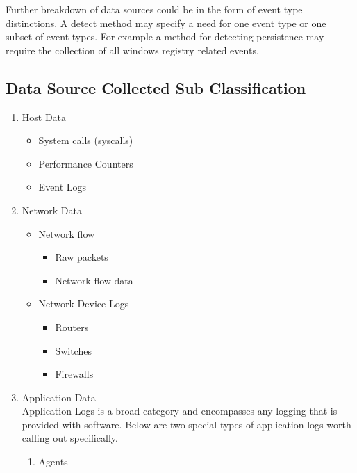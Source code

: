 Further breakdown of data sources could be in the form of event type distinctions. 
A detect method may specify a need for one event type or one subset of event types. 
For example a method for detecting persistence may require the collection of all windows registry related events.

\subsection{Data Source Collected Sub Classification}
\begin{enumerate}
    \item Host Data\cite{jia2017big}\cite{marchetti2016analysis}
    \begin{itemize}
        \item System calls (syscalls) \cite{warrender1999detecting}\cite{hofmeyr1998intrusion}
        \item Performance Counters
        \item Event Logs
    \end{itemize}
    \item Network Data
        \begin{itemize}
            \item Network flow \cite{kim2013detection}
            \begin{itemize}
                \item Raw packets
                \item Network flow data
            \end{itemize}
            \item Network Device Logs\cite{horne2002management}
            \begin{itemize}
                \item Routers
                \item Switches
                \item Firewalls
            \end{itemize}
        \end{itemize}
    \item Application Data\cite{giura2012context}\cite{ten2010cybersecurity}
    \\Application Logs is a broad category and encompasses any logging that is provided with software. Below are two special types of application logs worth calling out specifically.
        \begin{enumerate}
            \item Agents\cite{garcia2009anomaly}

\end{enumerate}
\end{enumerate}
